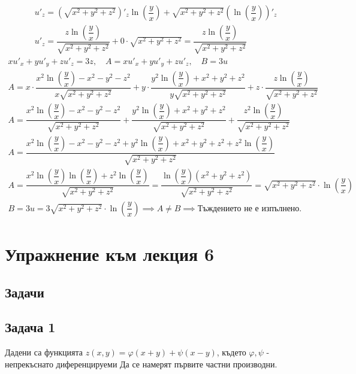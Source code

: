 \documentclass[a4paper,fleqn,12pt]{article}
\theoremstyle{definition}
\begin{document}
\begin{gather*}
u'_z = \left(\sqrt{x^2+y^2+z^2}\right)'_z\ln{\left( \dfrac{y}{x}\right)} + \sqrt{x^2+y^2+z^2}\left( \ln{\left( \dfrac{y}{x}\right)}\right)'_z \\
u'_z = \dfrac{z\ln{\left( \dfrac{y}{x}\right)}}{\sqrt{x^2+y^2+z^2}} + 0 \cdot \sqrt{x^2+y^2+z^2} = \dfrac{z\ln{\left( \dfrac{y}{x}\right)}}{\sqrt{x^2+y^2+z^2}}
\end{gather*}
\begin{gather*}
xu'_x + yu'_y + zu'_z = 3z , \quad A = xu'_x + yu'_y + zu'_z, \quad B = 3u\\
A = x \cdot \dfrac{x^2\ln{\left( \dfrac{y}{x}\right)} - x^2- y^2- z^2}{x\sqrt{x^2+y^2+z^2}} + y \cdot \dfrac{y^2\ln{\left( \dfrac{y}{x}\right)} + x^2 + y^2 + z^2}{y\sqrt{x^2+y^2+z^2}} + z \cdot \dfrac{z\ln{\left( \dfrac{y}{x}\right)}}{\sqrt{x^2+y^2+z^2}}\\
A = \dfrac{x^2\ln{\left( \dfrac{y}{x}\right)} - x^2- y^2- z^2}{\sqrt{x^2+y^2+z^2}} + \dfrac{y^2\ln{\left( \dfrac{y}{x}\right)} + x^2 + y^2 + z^2}{\sqrt{x^2+y^2+z^2}} + \dfrac{z^2\ln{\left( \dfrac{y}{x}\right)}}{\sqrt{x^2+y^2+z^2}}\\
A = \dfrac{x^2\ln{\left( \dfrac{y}{x}\right)} - x^2- y^2- z^2 + y^2\ln{\left( \dfrac{y}{x}\right)} + x^2 + y^2 + z^2 +z^2\ln{\left(\dfrac{y}{x}\right)}}{\sqrt{x^2+y^2+z^2}} \\
A = \dfrac{x^2\ln{\left( \dfrac{y}{x}\right)} \ln{\left( \dfrac{y}{x}\right)} + z^2\ln{\left(\dfrac{y}{x}\right)}}{\sqrt{x^2+y^2+z^2}} = \dfrac{\ln{\left( \dfrac{y}{x}\right)} (x^2 +y^2 + z^2)}{\sqrt{x^2+y^2+z^2}} = \sqrt{x^2+y^2+z^2}\cdot \ln{\left( \dfrac{y}{x}\right)}\\
B = 3u = 3\sqrt{x^2+y^2+z^2}\cdot \ln{\left( \dfrac{y}{x}\right)} \implies
A \neq B \implies \text{Тъждението не е изпълнено.}
\end{gather*}


\newpage
\section{Упражнение към лекция 6}

\subsection{Задачи}

\subsection*{Задача 1}
Дадени са функцията $z(x,y) = \varphi(x+y) + \psi(x-y)$, където $\varphi, \psi$ - непрекъснато диференцируеми
Да се намерят първите частни производни.
\end{document}
